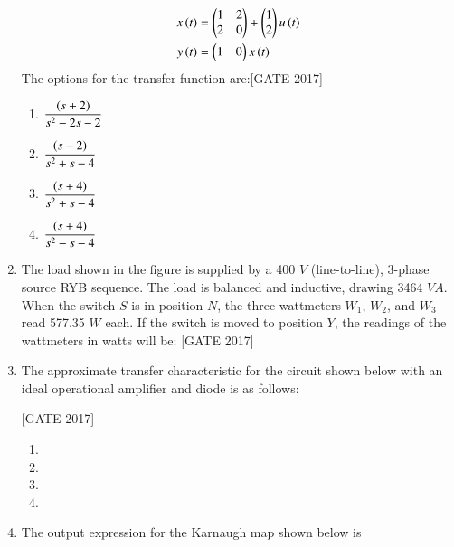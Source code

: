 \documentclass[journal,12pt,onecolumn]{IEEEtran}
\theoremstyle{remark}
\begin{document}
\begin{enumerate}
\begin{align*}
x\left(t\right) &= \begin{pmatrix} 1 & 2 \\ 2 & 0\end{pmatrix} + \begin{pmatrix}1 \\ 2 \end{pmatrix} u\left(t\right)  \\
y\left(t\right) &= \begin{pmatrix} 1 & 0\end{pmatrix} x\left(t\right)
\end{align*}
The options for the transfer function are:\hfill{[GATE 2017]} 
\begin{multicols}{2}
\begin{enumerate}
    \item $\dfrac{\left(s + 2\right)}{s^2 - 2s - 2}$\\
    \item  $\dfrac{\left(s - 2\right)}{s^2 + s - 4}$
    \item  $\dfrac{\left(s + 4\right)}{s^2 + s - 4}$\\
    \item  $\dfrac{\left(s + 4\right)}{s^2 - s - 4}$
\end{enumerate}     
\end{multicols}

\item The load shown in the figure is supplied by a 400 $V$ (line-to-line), 3-phase source RYB sequence. The load is balanced and inductive, drawing 3464 $VA$. When the switch $S$ is in position $ N $, the three wattmeters $W_1 $,  $W_2$, and $ W_3 $ read 577.35 $W$ each. If the switch is moved to position $Y$, the readings of the wattmeters in watts will be:
\hfill{[GATE 2017]} 


\item The approximate transfer characteristic for the circuit shown below with an ideal operational amplifier and diode is as follows:

\hfill{[GATE 2017]}
\begin{multicols}{2}
     \begin{enumerate}
    \item  
     \item   \item   \item 
\end{enumerate}
\end{multicols}

   

    

\item The output expression for the Karnaugh map shown below is



\end{enumerate}
\end{document}
